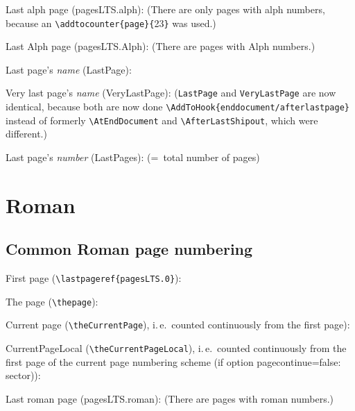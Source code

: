 \documentclass[british]{article}[2024/06/29]%
\def\pagesLTSexamplealph{23}
\begin{document}
Last alph page (pagesLTS.alph): 
(There are only  pages with alph numbers,
because an \verb|\addtocounter{page}{|\pagesLTSexamplealph\verb|}| was used.)\bigskip

Last Alph page (pagesLTS.Alph): 
(There are  pages with Alph numbers.)\bigskip

Last page's \textit{name} (LastPage): \bigskip

Very last page's \textit{name} (VeryLastPage): \newline
(\texttt{LastPage} and \texttt{VeryLastPage} are now identical, because both are now done
\verb|\AddToHook{enddocument/afterlastpage}| instead of formerly\newline
\verb|\AtEndDocument| and \verb|\AfterLastShipout|, which were different.)\bigskip

Last page's \textit{number} (LastPages): 
(=~total number of pages)
\newpage
{}
\section{Roman\label{Roman}}
\subsection{Common Roman page numbering}

First page (\verb|\lastpageref{pagesLTS.0}|):
\bigskip

The page (\verb|\thepage|): \thepage\bigskip

Current page (\verb|\theCurrentPage|),
i.\,e.~counted continuously from the first page): \theCurrentPage\bigskip

CurrentPageLocal (\verb|\theCurrentPageLocal|),
i.\,e.~counted continuously from the first page of the
current page numbering scheme (if option pagecontinue=false: sector)): \theCurrentPageLocal \bigskip

Last roman page (pagesLTS.roman): 
(There are  pages with roman numbers.)\bigskip
\end{document}
